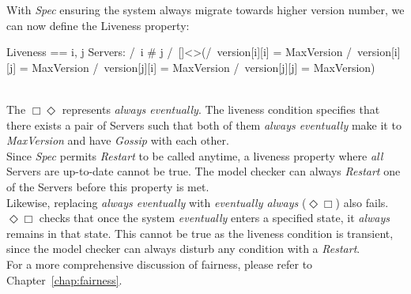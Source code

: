 With \textit{Spec} ensuring the system always migrate towards higher version
number, we can now define the Liveness property:\\

\begin{tla}
Liveness == 
    \E i, j \in Servers: 
        /\ i # j
        /\ []<>(/\ version[i][i] = MaxVersion
                /\ version[i][j] = MaxVersion
                /\ version[j][i] = MaxVersion
                /\ version[j][j] = MaxVersion)
\end{tla}
\begin{tlatex}
%
%
%
%
%
%
\end{tlatex}
\\

The $\Box\Diamond$ represents \textit{always eventually}. The liveness condition
specifies that there exists a pair of Servers such that both of them
\textit{always eventually} make it to \textit{MaxVersion} and have
\textit{Gossip} with each other.\\

Since \textit{Spec} permits \textit{Restart} to be called anytime, a liveness
property where \textit{all} Servers are up-to-date cannot be true. The model
checker can always \textit{Restart} one of the Servers before this property is
met.\\

Likewise, replacing \textit{always eventually} with \textit{eventually always}
($\Diamond\Box$) also fails. $\Diamond\Box$ checks that once the system
\textit{eventually} enters a specified state, it \textit{always} remains in that
state. This cannot be true as the liveness condition is transient, since the
model checker can always disturb any condition with a \textit{Restart}.\\

For a more comprehensive discussion of fairness, please refer to
Chapter~\ref{chap:fairness}.

% 


